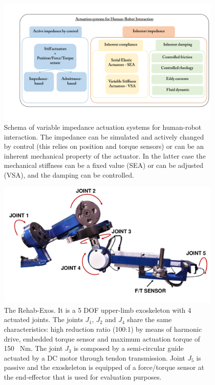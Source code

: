 \documentclass[journal]{IEEEtran}
\begin{document}
%
%
%
\begin{figure}[]
	\centering
	\includegraphics[width=1 \columnwidth]{actuators}
	\caption{Schema of variable impedance actuation systems for human-robot interaction. The impedance can be simulated and  actively changed by control (this relies on position and torque sensors) or can be an inherent mechanical property of the actuator. In the latter case the mechanical stiffness can be a fixed value (SEA) or can be adjusted (VSA), and the damping can be controlled.}
	\label{fig:exosActuators}
\end{figure}
%
\begin{figure}[htb]
	\centering
	\includegraphics[width=0.95\columnwidth]{RehabDescription} 
	\caption{The Rehab-Exos. It is a 5 DOF upper-limb exoskeleton  with 4 actuated joints. The joints $J_1$, $J_2$ and $J_4$ share the same characteristics: high reduction ratio (100:1) by means of harmonic drive, embedded torque sensor and maximum actuation torque of 150 \ Nm. The joint $J_3$ is composed by a semi-circular guide actuated by a DC motor through tendon transmission. Joint $J_5$ is passive and the exoskeleton is equipped of a force/torque sensor at the end-effector that is used for evaluation purposes.}
	\label{fig:rehabexos1} 
\end{figure}
\end{document}
